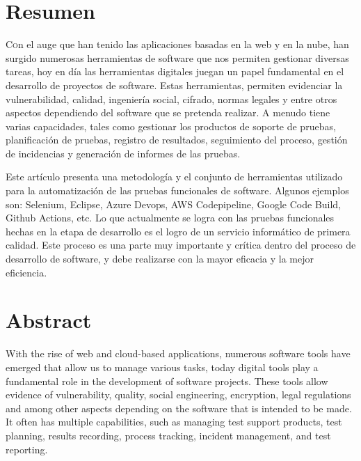 \documentclass[twoside,twocolumn]{article}
\begin{document}

\section{Resumen}

\lettrine[nindent=0em,lines=3]{C}on el auge que han tenido las aplicaciones basadas en la web y en la nube, han surgido numerosas herramientas de software que nos permiten gestionar diversas tareas, hoy en día las herramientas digitales juegan un papel fundamental en el desarrollo de proyectos de software. Estas herramientas, permiten evidenciar la vulnerabilidad, calidad, ingeniería social, cifrado, normas legales y entre otros aspectos dependiendo del software que se pretenda realizar.  A menudo tiene varias capacidades, tales como gestionar los productos de soporte de pruebas, planificación de pruebas, registro de resultados, seguimiento del proceso, gestión de incidencias y generación de informes de las pruebas. 

Este artículo presenta una metodología y el conjunto de herramientas utilizado para la automatización de las pruebas funcionales de software. Algunos ejemplos son: Selenium, Eclipse, Azure Devops, AWS Codepipeline, Google Code Build, Github Actions, etc. Lo que actualmente se logra con las pruebas funcionales hechas en la etapa de desarrollo es el logro de un servicio informático      de primera calidad. Este proceso es una parte muy importante y crítica dentro del proceso de desarrollo de software, y debe realizarse con la mayor eficacia y la mejor eficiencia. 





\section{Abstract}


With the rise of web and cloud-based applications, numerous software tools have emerged that allow us to manage various tasks, today digital tools play a fundamental role in the development of software projects. These tools allow evidence of vulnerability, quality, social engineering, encryption, legal regulations and among other aspects depending on the software that is intended to be made. It often has multiple capabilities, such as managing test support products, test planning, results recording, process tracking, incident management, and test reporting.
\end{document}

